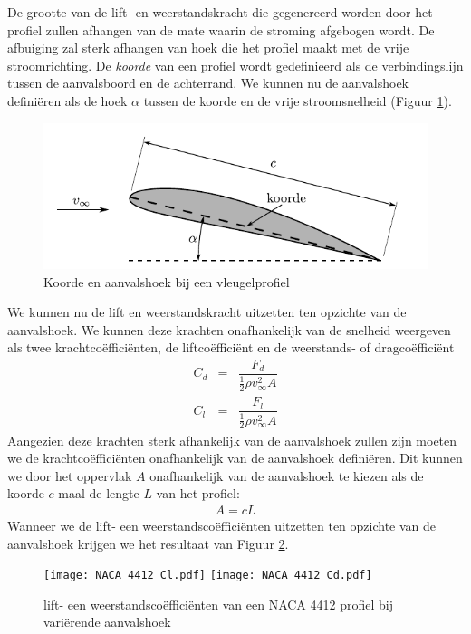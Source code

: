 De grootte van de lift- en weerstandskracht die gegenereerd worden door het profiel zullen afhangen van de mate waarin de stroming afgebogen wordt. De afbuiging zal sterk afhangen van hoek die het profiel maakt met de vrije stroomrichting.
De \emph{koorde} van een profiel wordt gedefinieerd als de verbindingslijn tussen de aanvalsboord en de achterrand. We kunnen nu de aanvalshoek definiëren als de hoek $\alpha$ tussen de koorde en de vrije stroomsnelheid (Figuur \ref{fig:vleugelprofiel aanvalshoek}).
\begin{figure}[htb]
	\centering
	\includegraphics{fig/uitwendige_stroming/vleugelprofiel_aanvalshoek}
	\caption{Koorde en aanvalshoek bij een vleugelprofiel}
	\label{fig:vleugelprofiel aanvalshoek}
\end{figure}
We kunnen nu de lift en weerstandskracht uitzetten ten opzichte van de aanvalshoek. We kunnen deze krachten onafhankelijk van de snelheid weergeven als twee krachtcoëfficiënten, de liftcoëfficiënt en de weerstands- of dragcoëfficiënt
\begin{eqnarray}
	C_d &=& \dfrac{F_d}{\frac{1}{2}\rho v_{\infty}^2 A} \\
	C_l &=& \dfrac{F_l}{\frac{1}{2}\rho v_{\infty}^2 A}
\end{eqnarray}
Aangezien deze krachten sterk afhankelijk van de aanvalshoek zullen zijn moeten we de krachtcoëfficiënten onafhankelijk van de aanvalshoek definiëren. Dit kunnen we door het oppervlak $A$ onafhankelijk van de aanvalshoek te kiezen als de koorde $c$ maal de lengte $L$ van het profiel:
\begin{eqnarray}
	A = c L
\end{eqnarray}
Wanneer we de lift- een weerstandscoëfficiënten uitzetten ten opzichte van de aanvalshoek krijgen we het resultaat van Figuur \ref{fig:lift en weerstand ifv aanvalshoek}.
\begin{figure}[htb]
	\centering
	\texttt{[image: NACA\_4412\_Cl.pdf]}
	\texttt{[image: NACA\_4412\_Cd.pdf]}
	\caption{lift- een weerstandscoëfficiënten van een NACA 4412 profiel bij variërende aanvalshoek}
	\label{fig:lift en weerstand ifv aanvalshoek}
\end{figure}


